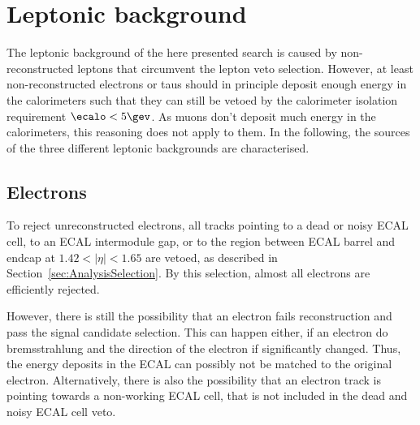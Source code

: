 \section{Leptonic background}
\label{sec:LeptonicBkg}

The leptonic background of the here presented search is caused by non-reconstructed leptons that circumvent the lepton veto selection.
However, at least non-reconstructed electrons or taus should in principle deposit enough energy in the calorimeters such that they can still be vetoed by the calorimeter isolation requirement $\ecalo<5\gev$.
As muons don't deposit much energy in the calorimeters, this reasoning does not apply to them.
In the following, the sources of the three different leptonic backgrounds are characterised.

\subsection*{Electrons}
To reject unreconstructed electrons, all tracks pointing to a dead or noisy ECAL cell, to an ECAL intermodule gap, or to the region between ECAL barrel and endcap at $1.42<|\eta|<1.65$ are vetoed, as described in Section~\ref{sec:AnalysisSelection}.
By this selection, almost all electrons are efficiently rejected.

However, there is still the possibility that an electron fails reconstruction and pass the signal candidate selection.
This can happen either, if an electron do bremsstrahlung and the direction of the electron if significantly changed.
Thus, the energy deposits in the ECAL can possibly not be matched to the original electron.
Alternatively, there is also the possibility that an electron track is pointing towards a non-working ECAL cell, that is not included in the dead and noisy ECAL cell veto.


